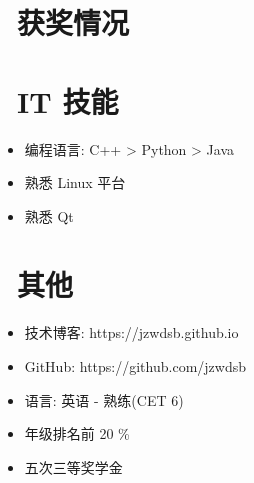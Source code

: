 \documentclass{resume}
\begin{document}
\section{\faHeartO\ 获奖情况}

\section{\faCogs\ IT 技能}
\begin{itemize}[parsep=0.5ex]
  \item 编程语言: C++ > Python > Java
  \item 熟悉 Linux 平台
  \item 熟悉 Qt
\end{itemize}



\section{\faInfo\ 其他}
\begin{itemize}[parsep=0.5ex]
  \item 技术博客: https://jzwdsb.github.io
  \item GitHub: https://github.com/jzwdsb
  \item 语言: 英语 - 熟练(CET 6)
  \item 年级排名前 20 \%
  \item 五次三等奖学金
\end{itemize}

%
%
\end{document}
